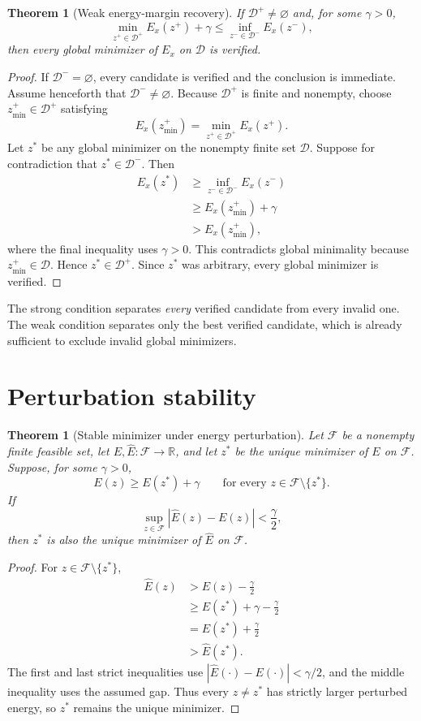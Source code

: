 \documentclass[11pt,oneside]{book}
\newtheorem{theorem}[definition]{Theorem}
\theoremstyle{remark}
\begin{document}
\begin{theorem}[Weak energy-margin recovery]
If $\mathcal D^+\ne\varnothing$ and, for some $\gamma>0$,
\[
\min_{z^+\in\mathcal D^+}E_x(z^+)+\gamma
\le\inf_{z^-\in\mathcal D^-}E_x(z^-),
\]
then every global minimizer of $E_x$ on $\mathcal D$ is verified.
\end{theorem}

\begin{proof}
If $\mathcal D^-=\varnothing$, every candidate is verified and the conclusion
is immediate. Assume henceforth that $\mathcal D^-\ne\varnothing$.
Because $\mathcal D^+$ is finite and nonempty, choose
$z_{\min}^+\in\mathcal D^+$ satisfying
\[
E_x(z_{\min}^+)=\min_{z^+\in\mathcal D^+}E_x(z^+).
\]
Let $z^*$ be any global minimizer on the nonempty finite set $\mathcal D$.
Suppose for contradiction that $z^*\in\mathcal D^-$. Then
\[
\begin{aligned}
E_x(z^*)
&\ge\inf_{z^-\in\mathcal D^-}E_x(z^-)\\
&\ge E_x(z_{\min}^+)+\gamma\\
&>E_x(z_{\min}^+),
\end{aligned}
\]
where the final inequality uses $\gamma>0$. This contradicts global
minimality because $z_{\min}^+\in\mathcal D$. Hence $z^*\in\mathcal D^+$.
Since $z^*$ was arbitrary, every global minimizer is verified.
\end{proof}

The strong condition separates \emph{every} verified candidate from every
invalid one. The weak condition separates only the best verified candidate,
which is already sufficient to exclude invalid global minimizers.

\section{Perturbation stability}

\begin{theorem}[Stable minimizer under energy perturbation]
Let $\mathcal F$ be a nonempty finite feasible set, let
$E,\widehat E:\mathcal F\to\mathbb R$, and let $z^*$ be the unique minimizer
of $E$ on $\mathcal F$. Suppose, for some $\gamma>0$,
\[
E(z)\ge E(z^*)+\gamma
\qquad\text{for every }z\in\mathcal F\setminus\{z^*\}.
\]
If
\[
\sup_{z\in\mathcal F}|\widehat E(z)-E(z)|<\frac{\gamma}{2},
\]
then $z^*$ is also the unique minimizer of $\widehat E$ on $\mathcal F$.
\end{theorem}

\begin{proof}
For $z\in\mathcal F\setminus\{z^*\}$,
\[
\begin{aligned}
\widehat E(z)
&>E(z)-\frac\gamma2\\
&\ge E(z^*)+\gamma-\frac\gamma2\\
&=E(z^*)+\frac\gamma2\\
&>\widehat E(z^*).
\end{aligned}
\]
The first and last strict inequalities use
$|\widehat E(\cdot)-E(\cdot)|<\gamma/2$, and the middle inequality uses the
assumed gap. Thus every $z\ne z^*$ has strictly larger perturbed energy, so
$z^*$ remains the unique minimizer.
\end{proof}
\end{document}
